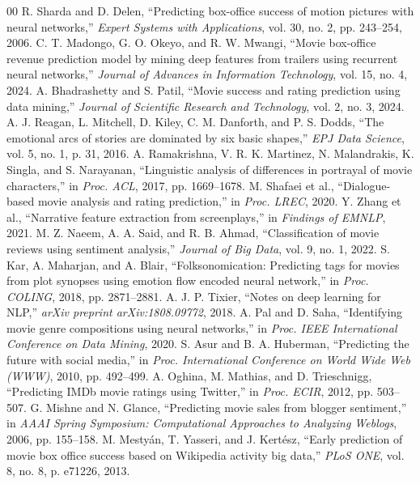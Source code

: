 \documentclass[conference]{IEEEtran}
\begin{document}
\begin{thebibliography}{00}
 R. Sharda and D. Delen, ``Predicting box-office success of motion pictures with neural networks,'' \textit{Expert Systems with Applications}, vol. 30, no. 2, pp. 243--254, 2006.
 C. T. Madongo, G. O. Okeyo, and R. W. Mwangi, ``Movie box-office revenue prediction model by mining deep features from trailers using recurrent neural networks,'' \textit{Journal of Advances in Information Technology}, vol. 15, no. 4, 2024.
 A. Bhadrashetty and S. Patil, ``Movie success and rating prediction using data mining,'' \textit{Journal of Scientific Research and Technology}, vol. 2, no. 3, 2024.
 A. J. Reagan, L. Mitchell, D. Kiley, C. M. Danforth, and P. S. Dodds, ``The emotional arcs of stories are dominated by six basic shapes,'' \textit{EPJ Data Science}, vol. 5, no. 1, p. 31, 2016.
 A. Ramakrishna, V. R. K. Martinez, N. Malandrakis, K. Singla, and S. Narayanan, ``Linguistic analysis of differences in portrayal of movie characters,'' in \textit{Proc. ACL}, 2017, pp. 1669--1678.
 M. Shafaei et al., ``Dialogue-based movie analysis and rating prediction,'' in \textit{Proc. LREC}, 2020.
 Y. Zhang et al., ``Narrative feature extraction from screenplays,'' in \textit{Findings of EMNLP}, 2021.
 M. Z. Naeem, A. A. Said, and R. B. Ahmad, ``Classification of movie reviews using sentiment analysis,'' \textit{Journal of Big Data}, vol. 9, no. 1, 2022.
 S. Kar, A. Maharjan, and A. Blair, ``Folksonomication: Predicting tags for movies from plot synopses using emotion flow encoded neural network,'' in \textit{Proc. COLING}, 2018, pp. 2871--2881.
 A. J. P. Tixier, ``Notes on deep learning for NLP,'' \textit{arXiv preprint arXiv:1808.09772}, 2018.
 A. Pal and D. Saha, ``Identifying movie genre compositions using neural networks,'' in \textit{Proc. IEEE International Conference on Data Mining}, 2020.
 S. Asur and B. A. Huberman, ``Predicting the future with social media,'' in \textit{Proc. International Conference on World Wide Web (WWW)}, 2010, pp. 492--499.
 A. Oghina, M. Mathias, and D. Trieschnigg, ``Predicting IMDb movie ratings using Twitter,'' in \textit{Proc. ECIR}, 2012, pp. 503--507.
 G. Mishne and N. Glance, ``Predicting movie sales from blogger sentiment,'' in \textit{AAAI Spring Symposium: Computational Approaches to Analyzing Weblogs}, 2006, pp. 155--158.
 M. Mesty\'{a}n, T. Yasseri, and J. Kert\'{e}sz, ``Early prediction of movie box office success based on Wikipedia activity big data,'' \textit{PLoS ONE}, vol. 8, no. 8, p. e71226, 2013.

\end{thebibliography}
\end{document}

